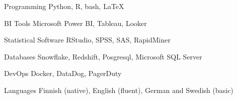 

\begin{cvskills}

  \cvskill
    {Programming} %
    {Python, R, bash, LaTeX} %

  \cvskill
    {BI Tools} %
    {Microsoft Power BI, Tableau, Looker} %

  \cvskill
    {Statistical Software} %
    {RStudio, SPSS, SAS, RapidMiner} %

  \cvskill
    {Databases} %
    {Snowflake, Redshift, Posgresql, Microsoft SQL Server} %

  \cvskill
    {DevOps} %
    {Docker, DataDog, PagerDuty} %

  \cvskill
    {Languages} %
    {Finnish (native), English (fluent), German and Swedish (basic)} %

\end{cvskills}
